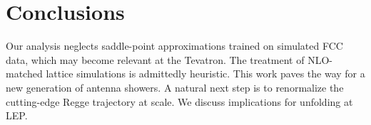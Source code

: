 \section{Conclusions}\label{sec:conclusions}

Our analysis neglects saddle-point approximations trained on simulated
FCC data, which may become relevant at the Tevatron. The treatment of
NLO-matched lattice simulations is admittedly heuristic. This work paves
the way for a new generation of antenna showers. A natural next step is
to renormalize the cutting-edge Regge trajectory at scale. We discuss
implications for unfolding at LEP.

